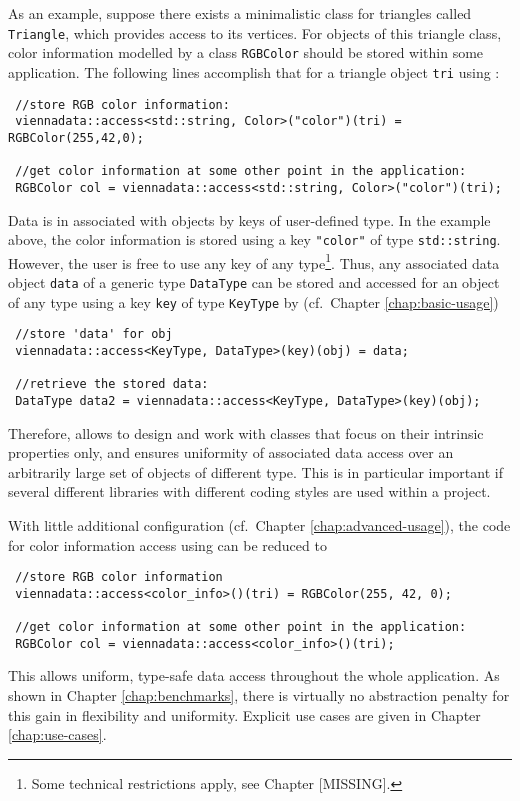 As an example, suppose there exists a minimalistic class for triangles called \lstinline|Triangle|, 
which provides access to its vertices. For objects of this triangle class, color information modelled by a class \lstinline|RGBColor| should be stored within some application.
The following lines accomplish that for a triangle object \lstinline|tri| using {\ViennaData}:
\begin{lstlisting}
 //store RGB color information:
 viennadata::access<std::string, Color>("color")(tri) = RGBColor(255,42,0);

 //get color information at some other point in the application:
 RGBColor col = viennadata::access<std::string, Color>("color")(tri);
\end{lstlisting}
Data is in {\ViennaData} associated with objects by keys of user-defined type. In the example above,
the color information is stored using a key \lstinline|"color"| of type \lstinline|std::string|.
However, the user is free to use any key of any type\footnote{Some technical restrictions apply, see Chapter [MISSING].}.
Thus, any associated data object \lstinline|data| of a generic type \lstinline|DataType| can be stored and accessed for an object of any type using a key \lstinline|key| of type \lstinline|KeyType|
by (cf.~Chapter \ref{chap:basic-usage})
\begin{lstlisting}
 //store 'data' for obj
 viennadata::access<KeyType, DataType>(key)(obj) = data;

 //retrieve the stored data:
 DataType data2 = viennadata::access<KeyType, DataType>(key)(obj);
\end{lstlisting}
Therefore, {\ViennaData} allows to design and work with classes that focus on their intrinsic properties only, and 
ensures uniformity of associated data access over an arbitrarily large set of objects of different type.
This is in particular important if several different libraries with different coding styles are used within a project.

With little additional configuration (cf.~Chapter \ref{chap:advanced-usage}), the code for color information access using {\ViennaData} can be reduced to
\begin{lstlisting}
 //store RGB color information
 viennadata::access<color_info>()(tri) = RGBColor(255, 42, 0);

 //get color information at some other point in the application:
 RGBColor col = viennadata::access<color_info>()(tri);
\end{lstlisting}
This allows uniform, type-safe data access throughout the whole application.
As shown in Chapter \ref{chap:benchmarks}, there is virtually no abstraction penalty for this gain in flexibility and uniformity. Explicit use cases are given in Chapter \ref{chap:use-cases}.

